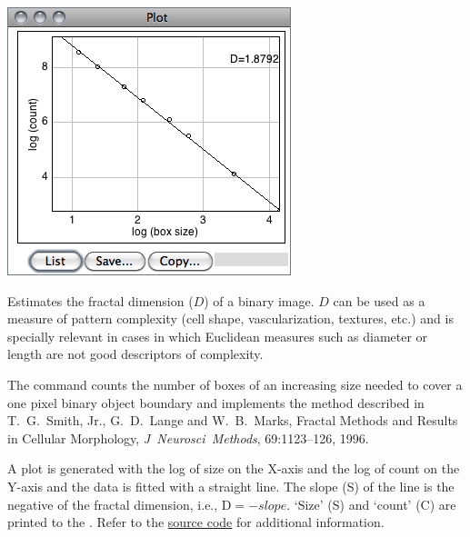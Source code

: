\begin{minipage}[c][1\totalheight][t]{0.44\columnwidth}%
\includegraphics[scale=0.55]{images/FractalBoxCount}%
\end{minipage}%
\begin{minipage}[c][1\totalheight][t]{0.56\columnwidth}%
Estimates the fractal dimension ($D$) of a binary image. $D$ can
be used as a measure of pattern complexity (cell shape, vascularization,
textures, etc.) and is specially relevant in cases in which Euclidean
measures such as diameter or length are not good descriptors of complexity.\medskip{}


The command counts the number of boxes of an increasing size needed
to cover a one pixel binary object boundary and implements the method
described in T.\ G.\ Smith, Jr., G.\ D.\ Lange and W.\ B.\ Marks,
Fractal Methods and Results in Cellular Morphology, \emph{J\ Neurosci\ Methods},
69:1123--126, 1996.%
\end{minipage}

A plot is generated with the log of size on the X-axis and the log
of count on the Y-axis and the data is fitted with a straight line.
The slope (S) of the line is the negative of the fractal dimension,
i.e., D$=-slope$. `Size' (S) and `count' (C) are printed to the
. Refer to the \href{http://imagej.nih.gov/ij/source/ij/plugin/filter/FractalBoxCounter.java}{source code}
for additional information.




\subsubsection{\protect{}\label{sub:Analyze-Line-Graph}}

